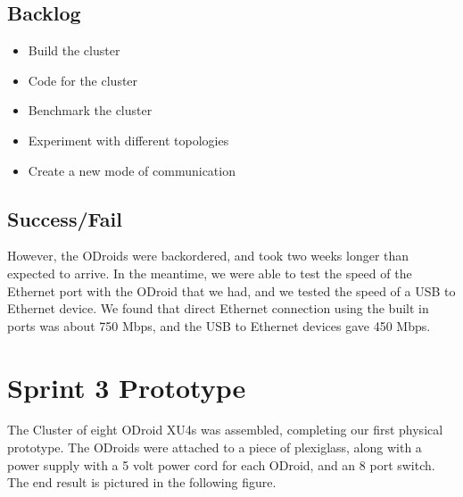 \subsection{Backlog}

\begin{itemize}
\item Build the cluster
\item Code for the cluster
\item Benchmark the cluster
\item Experiment with different topologies
\item Create a new mode of communication
\end{itemize}

\subsection{Success/Fail} 

However, the ODroids were backordered, and took two weeks longer than expected to arrive. In the meantime, we were able to test the speed of the Ethernet port with the ODroid that we had, and we tested the speed of a USB to Ethernet device. We found that direct Ethernet connection using the built in ports was about 750 Mbps, and the USB to Ethernet devices gave 450 Mbps.

\section{Sprint 3 Prototype}

The Cluster of eight ODroid XU4s was assembled, completing our first physical prototype. The ODroids were attached to a piece of plexiglass, along with a power supply with a 5 volt power cord for each ODroid, and an 8 port switch. The end result is pictured in the following figure.

